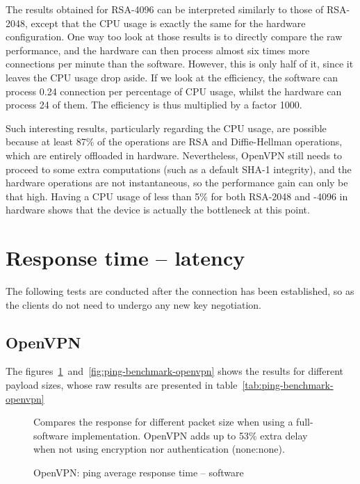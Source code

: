 \noindent The results obtained for RSA-4096 can be interpreted similarly to those of RSA-2048, except that the CPU usage is exactly the same for the hardware configuration.
One way too look at those results is to directly compare the raw performance, and the hardware can then process almost six times more connections per minute than the software.
However, this is only half of it, since it leaves the CPU usage drop aside.
If we look at the efficiency, the software can process 0.24 connection per percentage of CPU usage, whilst the hardware can process 24 of them.
The efficiency is thus multiplied by a factor 1000.

Such interesting results, particularly regarding the CPU usage, are possible because at least 87\% of the operations are RSA and Diffie-Hellman operations, which are entirely offloaded in hardware.
Nevertheless, OpenVPN still needs to proceed to some extra computations (such as a default SHA-1 integrity), and the hardware operations are not instantaneous, so the performance gain can only be that high.
Having a CPU usage of less than 5\% for both RSA-2048 and -4096 in hardware shows that the device is actually the bottleneck at this point.












\section{Response time -- latency}
The following tests are conducted after the connection has been established, so as the clients do not need to undergo any new key negotiation.

\subsection{OpenVPN}
The figures~\ref{fig:ping-benchmark-openvpn-soft}~and~\ref{fig:ping-benchmark-openvpn} shows the results for different payload sizes, whose raw results are presented in table~\ref{tab:ping-benchmark-openvpn}

\begin{figure}[ht]

\caption{OpenVPN: ping average response time -- software}{Compares the response for different packet size when using a full-software implementation. OpenVPN adds up to 53\% extra delay when not using encryption nor authentication (none:none).}
\label{fig:ping-benchmark-openvpn-soft}
\end{figure}

